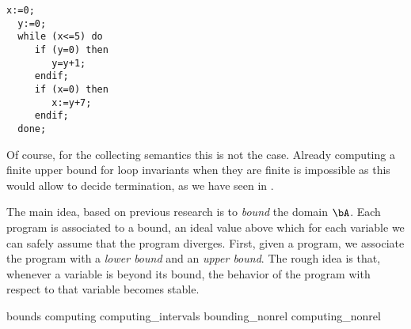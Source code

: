 \begin{lstlisting}[caption=Code sample where analysis of
  \(\fix{\com}\) is less precise than \(\com^*\), label=code1,
  language=Imp]
  x:=0;
  y:=0;
  while (x<=5) do
     if (y=0) then
        y=y+1;
     endif;
     if (x=0) then
        x:=y+7;
     endif;
  done;
\end{lstlisting}

Of course, for the collecting semantics this is not the case. Already
computing a finite upper bound for loop invariants when they are
finite is impossible as this would allow to decide termination, as we
have seen in .


The main idea, based on previous research is to \emph{bound} the
domain \(\bA\). Each program is associated to a bound, an ideal value
above which for each variable we can safely assume that the program
diverges.  First, given a program, we associate the program with a
\emph{lower bound} and an \emph{upper bound}. The rough idea is that,
whenever a variable is beyond its bound, the behavior of the program
with respect to that variable becomes stable. %

{bounds}
{computing}
{computing_intervals}
{bounding_nonrel}
{computing_nonrel}
